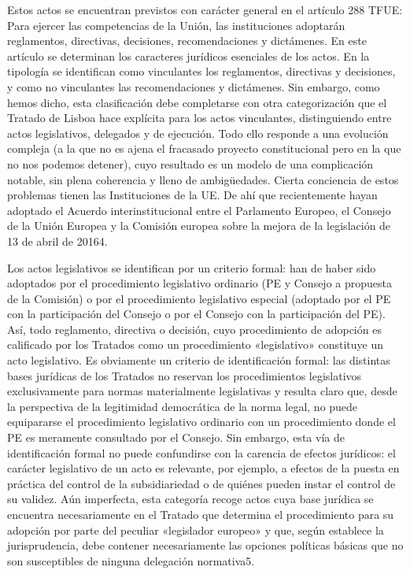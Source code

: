 \documentclass[10pt,a4paper]{article}
\begin{document}
Estos actos se encuentran previstos con carácter general en el artículo 288 TFUE: Para ejercer las competencias de la Unión, las instituciones adoptarán reglamentos, directivas, decisiones, recomendaciones y dictámenes. En este artículo se determinan los caracteres jurídicos esenciales de los actos. En la tipología se identifican como vinculantes los reglamentos, directivas y decisiones, y como no vinculantes las recomendaciones y dictámenes. Sin embargo, como hemos dicho, esta clasificación debe completarse con otra categorización que el Tratado de Lisboa hace explícita para los actos vinculantes, distinguiendo entre actos legislativos, delegados y de ejecución. Todo ello responde a una evolución compleja (a la que no es ajena el fracasado proyecto constitucional pero en la que no nos podemos detener), cuyo resultado es un modelo de una complicación notable, sin plena coherencia y lleno de ambigüedades. Cierta conciencia de estos problemas tienen las Instituciones de la UE. De ahí que recientemente hayan adoptado el Acuerdo interinstitucional entre el Parlamento Europeo, el Consejo de la Unión Europea y la Comisión europea sobre la mejora de la legislación de 13 de abril de 20164.

Los actos legislativos se identifican por un criterio formal: han de haber sido adoptados por el procedimiento legislativo ordinario (PE y Consejo a propuesta de la Comisión) o por el procedimiento legislativo especial (adoptado por el PE con la participación del Consejo o por el Consejo con la participación del PE). Así, todo reglamento, directiva o decisión, cuyo procedimiento de adopción es calificado por los Tratados como un procedimiento «legislativo» constituye un acto legislativo. Es obviamente un criterio de identificación formal: las distintas bases jurídicas de los Tratados no reservan los procedimientos legislativos exclusivamente para normas materialmente legislativas y resulta claro que, desde la perspectiva de la legitimidad democrática de la norma legal, no puede equipararse el procedimiento legislativo ordinario con un procedimiento donde el PE es meramente consultado por el Consejo. Sin embargo, esta vía de identificación formal no puede confundirse con la carencia de efectos jurídicos: el carácter legislativo de un acto es relevante, por ejemplo, a efectos de la puesta en práctica del control de la subsidiariedad o de quiénes pueden instar el control de su validez. Aún imperfecta, esta categoría recoge actos cuya base jurídica se encuentra necesariamente en el Tratado que determina el procedimiento para su adopción por parte del peculiar «legislador europeo» y que, según establece la jurisprudencia, debe contener necesariamente las opciones políticas básicas que no son susceptibles de ninguna delegación normativa5.
\end{document}

